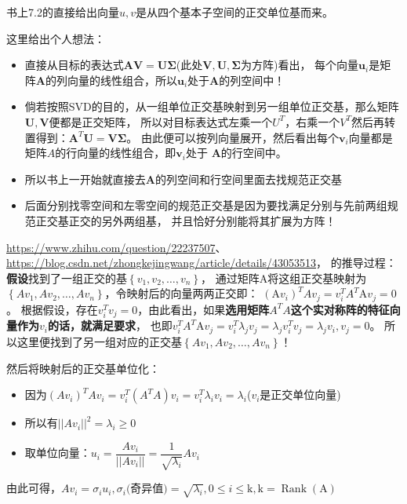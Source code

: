 书上7.2的直接给出向量$u,v$是从四个基本子空间的正交单位基而来。

这里给出个人想法：
\begin{itemize}
    \item 直接从目标的表达式$\bm{A V=U \Sigma}$(此处$\bm{V,U,\Sigma}$为方阵)看出，
    每个向量$\bm{u}_i$是矩阵$\bm{A}$的列向量的线性组合，所以$\bm{u}_i$处于$\bm{A}$的列空间中！
    \item 倘若按照SVD的目的，从一组单位正交基映射到另一组单位正交基，那么矩阵$\bm{U,V}$便都是正交矩阵，
    所以对目标表达式左乘一个$U^T$，右乘一个$V^T$然后再转置得到：$\bm{A}^T\bm{U} = \bm{V\Sigma}$。
    由此便可以按列向量展开，然后看出每个$\bm{v}_i$向量都是矩阵$A$的行向量的线性组合，即$\bm{v}_i$处于
    $\bm{A}$的行空间中。
    \item 所以书上一开始就直接去$\bm{A}$的列空间和行空间里面去找规范正交基
    \item 后面分别找零空间和左零空间的规范正交基是因为要找满足分别与先前两组规范正交基正交的另外两组基，
    并且恰好分别能将其扩展为方阵！
\end{itemize}

\url{https://www.zhihu.com/question/22237507}、\url{https://blog.csdn.net/zhongkejingwang/article/details/43053513}，
的推导过程：
\\
\textbf{假设}找到了一组正交的基$\left\{v_{1}, v_{2}, \ldots, v_{n}\right\}$，
通过矩阵A将这组正交基映射为$\left\{A v_{1}, A v_{2}, \ldots, A v_{n}\right\}$，令映射后的向量两两正交即：
$\left(\mathrm{A} v_{i}\right)^{T} A v_{j}=v_{i}^{T} A^{T} \mathrm{A} v_{j}=0$。
根据假设，存在$v_{i}^{T} v_{j}=0$，由此看出，如果\textbf{选用矩阵$A^TA$这个实对称阵的特征向量作为$v_i$的话，就满足要求}，
也即$v_{i}^{T} A^{T} \mathrm{A} v_{j}= v_{i}^{T} \lambda_{j} v_{j} =\lambda_{j} v_{i}^{T} v_{j} =\lambda_{j} v_{i}, v_{j}=0$。
所以这里便找到了另一组对应的正交基$\left\{A v_{1}, A v_{2}, \ldots, A v_{n}\right\}$！

然后将映射后的正交基单位化：
\begin{itemize}
    \item 因为$(A v_{i})^T A v_{i}=v_{i}^T (A^TA)v_i = v_{i}^T \lambda_{i} v_{i}=\lambda_{i}$($v_i$是正交单位向量)
    \item 所以有$\left||A v_{i}\right||^{2}=\lambda_{i} \geq 0$
    \item 取单位向量：$u_{i}=\dfrac{A v_{i}}{\left||A v_{i}\right||}=\dfrac{1}{\sqrt{\lambda_{i}}} A v_{i}$
\end{itemize}
由此可得，$A v_{i}=\sigma_{i} u_{i}, \sigma_{i}($奇异值$)=\sqrt{\lambda_{i}}, 0 \leq i \leq \mathrm{k}, \mathrm{k}=\operatorname{Rank}(\mathrm{A})$


